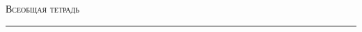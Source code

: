 
\begin{center}
    \LARGE \textsc{Всеобщая тетрадь}
\end{center}

\hrule

\phantom{42}

\thispagestyle{empty}
\tableofcontents
\newpage